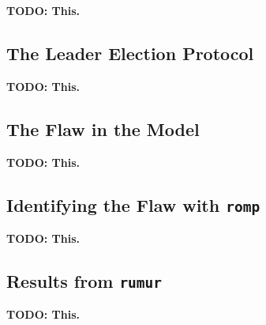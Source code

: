 
\textbf{TODO: This.}

\subsection{The Leader Election Protocol}\label{subsec:the-leader-election-protocol}

\textbf{TODO: This.}

\subsection{The Flaw in the Model}\label{subsec:the-flaw-in-the-model}

\textbf{TODO: This.}

\subsection{Identifying the Flaw with \texttt{romp}}\label{subsec:identifying-the-flaw-in-romp}

\textbf{TODO: This.}

\subsection{Results from \texttt{rumur}}\label{subsec:results-from-rumur}

\textbf{TODO: This.}
